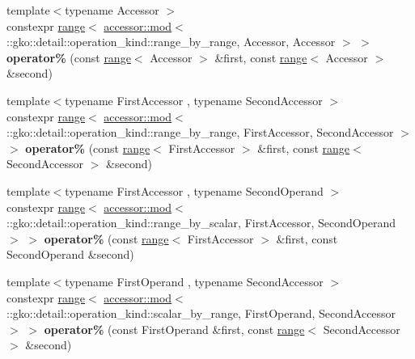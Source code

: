 \begin{DoxyCompactItemize}
\item 
\mbox{\label{namespacegko_aabcbe4818e5316566e04afa5d653ec23}} 
{\footnotesize template$<$typename Accessor $>$ }\\constexpr \hyperlink{classgko_1_1range}{range}$<$ \hyperlink{structgko_1_1accessor_1_1mod}{accessor\+::mod}$<$ \+::gko\+::detail\+::operation\+\_\+kind\+::range\+\_\+by\+\_\+range, Accessor, Accessor $>$ $>$ {\bfseries operator\%} (const \hyperlink{classgko_1_1range}{range}$<$ Accessor $>$ \&first, const \hyperlink{classgko_1_1range}{range}$<$ Accessor $>$ \&second)
\item 
\mbox{\label{namespacegko_af02261bf3b7594d48bb51093593896e1}} 
{\footnotesize template$<$typename First\+Accessor , typename Second\+Accessor $>$ }\\constexpr \hyperlink{classgko_1_1range}{range}$<$ \hyperlink{structgko_1_1accessor_1_1mod}{accessor\+::mod}$<$ \+::gko\+::detail\+::operation\+\_\+kind\+::range\+\_\+by\+\_\+range, First\+Accessor, Second\+Accessor $>$ $>$ {\bfseries operator\%} (const \hyperlink{classgko_1_1range}{range}$<$ First\+Accessor $>$ \&first, const \hyperlink{classgko_1_1range}{range}$<$ Second\+Accessor $>$ \&second)
\item 
\mbox{\label{namespacegko_a175e929e92316d5352207795a0da2a82}} 
{\footnotesize template$<$typename First\+Accessor , typename Second\+Operand $>$ }\\constexpr \hyperlink{classgko_1_1range}{range}$<$ \hyperlink{structgko_1_1accessor_1_1mod}{accessor\+::mod}$<$ \+::gko\+::detail\+::operation\+\_\+kind\+::range\+\_\+by\+\_\+scalar, First\+Accessor, Second\+Operand $>$ $>$ {\bfseries operator\%} (const \hyperlink{classgko_1_1range}{range}$<$ First\+Accessor $>$ \&first, const Second\+Operand \&second)
\item 
\mbox{\label{namespacegko_abe20522bc3e2a9e6f1069d783cad8e06}} 
{\footnotesize template$<$typename First\+Operand , typename Second\+Accessor $>$ }\\constexpr \hyperlink{classgko_1_1range}{range}$<$ \hyperlink{structgko_1_1accessor_1_1mod}{accessor\+::mod}$<$ \+::gko\+::detail\+::operation\+\_\+kind\+::scalar\+\_\+by\+\_\+range, First\+Operand, Second\+Accessor $>$ $>$ {\bfseries operator\%} (const First\+Operand \&first, const \hyperlink{classgko_1_1range}{range}$<$ Second\+Accessor $>$ \&second)

\end{DoxyCompactItemize}
